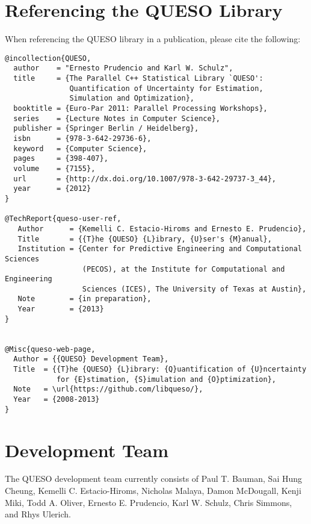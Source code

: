 \section*{Referencing the QUESO Library}
When referencing the QUESO library in a publication, please cite the following:
\begin{verbatim}
@incollection{QUESO,
  author    = "Ernesto Prudencio and Karl W. Schulz",
  title     = {The Parallel C++ Statistical Library `QUESO':
               Quantification of Uncertainty for Estimation,
               Simulation and Optimization},
  booktitle = {Euro-Par 2011: Parallel Processing Workshops},
  series    = {Lecture Notes in Computer Science},
  publisher = {Springer Berlin / Heidelberg},
  isbn      = {978-3-642-29736-6},
  keyword   = {Computer Science},
  pages     = {398-407},
  volume    = {7155},
  url       = {http://dx.doi.org/10.1007/978-3-642-29737-3_44},
  year      = {2012}
}

@TechReport{queso-user-ref,
   Author      = {Kemelli C. Estacio-Hiroms and Ernesto E. Prudencio},
   Title       = {{T}he {QUESO} {L}ibrary, {U}ser's {M}anual},
   Institution = {Center for Predictive Engineering and Computational Sciences
                  (PECOS), at the Institute for Computational and Engineering
                  Sciences (ICES), The University of Texas at Austin},
   Note        = {in preparation},
   Year        = {2013}
}


@Misc{queso-web-page,
  Author = {{QUESO} Development Team},
  Title  = {{T}he {QUESO} {L}ibrary: {Q}uantification of {U}ncertainty
            for {E}stimation, {S}imulation and {O}ptimization},
  Note   = \url{https://github.com/libqueso/},
  Year   = {2008-2013}
}

\end{verbatim}
% 
% 
\section*{\Queso{} Development Team}

The QUESO development team currently consists of
Paul T. Bauman,
Sai Hung Cheung,
Kemelli C. Estacio-Hiroms,
Nicholas Malaya,
Damon McDougall,
Kenji Miki,
Todd A. Oliver,
Ernesto E. Prudencio,
Karl W. Schulz, 
Chris Simmons, and
Rhys Ulerich.

% 
